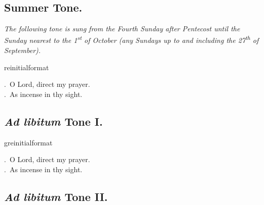 \documentclass[12pt]{article} %
\newcommand{\myaboveinitial}[1]{%
    \expandafter\renewcommand\csname greinitialformat\endcsname[1]{%
        \fontsize{43}{43}\selectfont ##1
    }
    \gresetfirstlineaboveinitial{\textcolor{benred8}{\raisebox{6.0mm}{\small \textsc{\textbf{#1}}}}}{}
}
\newenvironment{rubric}{\vspace{1 mm}\color{benred8} \itshape \leftskip 0in \setlength{\parindent}{0.25in}}{\vspace{1 mm}}
\newenvironment{response}{\leftskip 0in \setlength{\parindent}{0in}}{\vspace{1 mm}}
\let\oldVbar\Vbar
\renewcommand{\Vbar}{\textcolor{benred8}{\oldVbar .}}
\let\oldRbar\Rbar
\renewcommand{\Rbar}{\textcolor{benred8}{\oldRbar .}}
\begin{document}
\begin{pages}
\begin{Rightside}

\subsection*{Summer Tone.}

\pend\pstart

\begin{rubric}
The following tone is sung from the Fourth Sunday after Pentecost until the Sunday nearest to the 1\textsuperscript{st} of October (any Sundays up to and including the 27\textsuperscript{th} of September).

\end{rubric}

\pend\pstart


\myaboveinitial{VIII}

\pend\pstart

\begin{response}
\Vbar\ O Lord, direct my prayer.\\
\Rbar\ As incense in thy sight.

\end{response}

\pend\pstart


\subsection*{\emph{Ad libitum} Tone I.}

\pend\pstart


\myaboveinitial{VIII}

\pend\pstart

\begin{response}
\Vbar\ O Lord, direct my prayer.\\
\Rbar\ As incense in thy sight.

\end{response}

\pend\pstart


\subsection*{\emph{Ad libitum} Tone II.}


\end{Rightside}
\end{pages}
\end{document}
